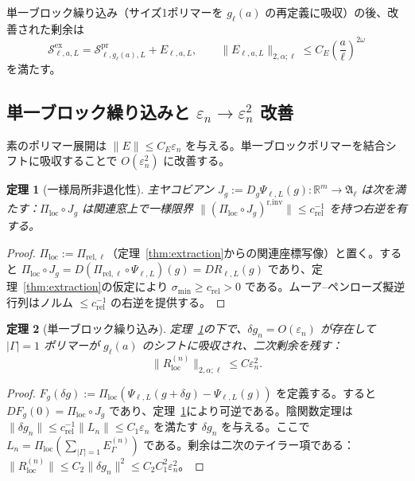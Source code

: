 \documentclass[12pt]{article}
\theoremstyle{plain}
\newtheorem{theorem}{定理}[section]
\theoremstyle{definition}
\numberwithin{equation}{section}
\newcommand{\R}{\mathbb{R}}
\newcommand{\fA}{\mathfrak{A}}
\newcommand{\pr}{\mathrm{pr}}
\newcommand{\loc}{\mathrm{loc}}
\newcommand{\ex}{\mathrm{ex}}
\begin{document}
単一ブロック繰り込み（サイズ1ポリマーを $g_\ell(a)$ の再定義に吸収）の後、改善された剰余は
\begin{equation}
\boxed{\mathcal{S}^{\ex}_{\ell,a,L} = \mathcal{S}^{\pr}_{\ell,g_\ell(a),L} + E_{\ell,a,L},\qquad
\|E_{\ell,a,L}\|_{2,\alpha;\ell} \leq C_E\left(\frac{a}{\ell}\right)^{2\omega}}
\end{equation}
を満たす。

\subsection{単一ブロック繰り込みと $\varepsilon_n\to\varepsilon_n^2$ 改善}\label{sec:oneblock}

素のポリマー展開は $\|E\|\leq C_E\varepsilon_n$ を与える。単一ブロックポリマーを結合シフトに吸収することで $O(\varepsilon_n^2)$ に改善する。

\begin{theorem}[一様局所非退化性]\label{thm:localnondeg}
主ヤコビアン $J_g:=D_g\Psi_{\ell,L}(g):\R^m\to\fA_\ell$ は次を満たす：$\Pi_{\loc}\circ J_g$ は関連窓上で一様限界 $\|(\Pi_{\loc}\circ J_g)^{\mathrm{r.inv}}\|\leq c_{\mathrm{rel}}^{-1}$ を持つ右逆を有する。
\end{theorem}

\begin{proof}
$\Pi_{\loc}:=\Pi_{\mathrm{rel},\ell}$（定理~\ref{thm:extraction}からの関連座標写像）と置く。すると $\Pi_{\loc}\circ J_g=D(\Pi_{\mathrm{rel},\ell}\circ\Psi_{\ell,L})(g)=DR_{\ell,L}(g)$ であり、定理~\ref{thm:extraction}の仮定により $\sigma_{\min}\geq c_{\mathrm{rel}}>0$ である。ムーア--ペンローズ擬逆行列はノルム $\leq c_{\mathrm{rel}}^{-1}$ の右逆を提供する。
\end{proof}

\begin{theorem}[単一ブロック繰り込み]\label{thm:oneblock}
定理~\ref{thm:localnondeg}の下で、$\delta g_n=O(\varepsilon_n)$ が存在して $|\Gamma|=1$ ポリマーが $g_\ell(a)$ のシフトに吸収され、二次剰余を残す：
\begin{equation}
\|R_{\loc}^{(n)}\|_{2,\alpha;\ell} \leq C\varepsilon_n^2.
\end{equation}
\end{theorem}

\begin{proof}
$F_g(\delta g):=\Pi_{\loc}(\Psi_{\ell,L}(g+\delta g)-\Psi_{\ell,L}(g))$ を定義する。すると $DF_g(0)=\Pi_{\loc}\circ J_g$ であり、定理~\ref{thm:localnondeg}により可逆である。陰関数定理は $\|\delta g_n\|\leq c_{\mathrm{rel}}^{-1}\|L_n\|\leq C_1\varepsilon_n$ を満たす $\delta g_n$ を与える。ここで $L_n=\Pi_{\loc}(\sum_{|\Gamma|=1}E_\Gamma^{(n)})$ である。剰余は二次のテイラー項である：$\|R_{\loc}^{(n)}\|\leq C_2\|\delta g_n\|^2\leq C_2 C_1^2\varepsilon_n^2$。
\end{proof}
\end{document}
